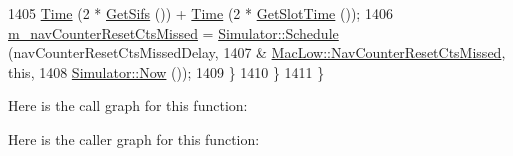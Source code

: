 \begin{DoxyCode}
1405             \hyperlink{namespacens3_1_1TracedValueCallback_a7ffd3e7c142ffe7c8a1d2db9b8de38ec}{Time} (2 * \hyperlink{classns3_1_1MacLow_a9107421b7ed9f291d60b8344b4918e56}{GetSifs} ()) + \hyperlink{namespacens3_1_1TracedValueCallback_a7ffd3e7c142ffe7c8a1d2db9b8de38ec}{Time} (2 * \hyperlink{classns3_1_1MacLow_a8a1429d2aba218b4a4e2e5ad37dce6c8}{GetSlotTime} ());
1406           \hyperlink{classns3_1_1MacLow_a5aef4547e2a6ddad9c85d55bf77e43b1}{m\_navCounterResetCtsMissed} = 
      \hyperlink{classns3_1_1Simulator_a671882c894a08af4a5e91181bf1eec13}{Simulator::Schedule} (navCounterResetCtsMissedDelay,
1407                                                             &
      \hyperlink{classns3_1_1MacLow_af0f8457a65c1870cbba6289da87f96d6}{MacLow::NavCounterResetCtsMissed}, \textcolor{keyword}{this},
1408                                                             \hyperlink{classns3_1_1Simulator_ac3178fa975b419f7875e7105be122800}{Simulator::Now} ());
1409         \}
1410     \}
1411 \}
\end{DoxyCode}


Here is the call graph for this function\+:




Here is the caller graph for this function\+:


